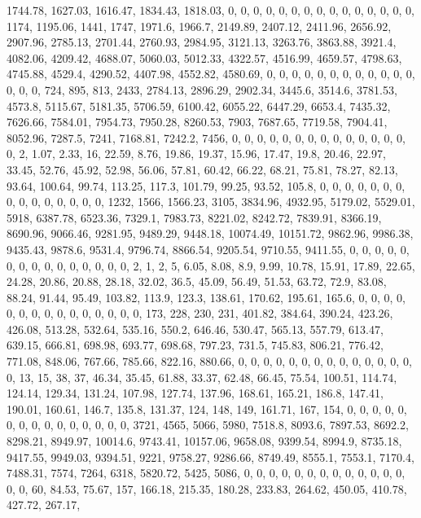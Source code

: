 \documentclass[
]{article}
\begin{document}
1744.78, 1627.03, 1616.47, 1834.43, 1818.03, 0, 0, 0, 0, 0, 0, 0, 0, 0,
0, 0, 0, 0, 0, 0, 1174, 1195.06, 1441, 1747, 1971.6, 1966.7, 2149.89,
2407.12, 2411.96, 2656.92, 2907.96, 2785.13, 2701.44, 2760.93, 2984.95,
3121.13, 3263.76, 3863.88, 3921.4, 4082.06, 4209.42, 4688.07, 5060.03,
5012.33, 4322.57, 4516.99, 4659.57, 4798.63, 4745.88, 4529.4, 4290.52,
4407.98, 4552.82, 4580.69, 0, 0, 0, 0, 0, 0, 0, 0, 0, 0, 0, 0, 0, 0, 0,
724, 895, 813, 2433, 2784.13, 2896.29, 2902.34, 3445.6, 3514.6, 3781.53,
4573.8, 5115.67, 5181.35, 5706.59, 6100.42, 6055.22, 6447.29, 6653.4,
7435.32, 7626.66, 7584.01, 7954.73, 7950.28, 8260.53, 7903, 7687.65,
7719.58, 7904.41, 8052.96, 7287.5, 7241, 7168.81, 7242.2, 7456, 0, 0, 0,
0, 0, 0, 0, 0, 0, 0, 0, 0, 0, 0, 0, 2, 1.07, 2.33, 16, 22.59, 8.76,
19.86, 19.37, 15.96, 17.47, 19.8, 20.46, 22.97, 33.45, 52.76, 45.92,
52.98, 56.06, 57.81, 60.42, 66.22, 68.21, 75.81, 78.27, 82.13, 93.64,
100.64, 99.74, 113.25, 117.3, 101.79, 99.25, 93.52, 105.8, 0, 0, 0, 0,
0, 0, 0, 0, 0, 0, 0, 0, 0, 0, 0, 1232, 1566, 1566.23, 3105, 3834.96,
4932.95, 5179.02, 5529.01, 5918, 6387.78, 6523.36, 7329.1, 7983.73,
8221.02, 8242.72, 7839.91, 8366.19, 8690.96, 9066.46, 9281.95, 9489.29,
9448.18, 10074.49, 10151.72, 9862.96, 9986.38, 9435.43, 9878.6, 9531.4,
9796.74, 8866.54, 9205.54, 9710.55, 9411.55, 0, 0, 0, 0, 0, 0, 0, 0, 0,
0, 0, 0, 0, 0, 0, 2, 1, 2, 5, 6.05, 8.08, 8.9, 9.99, 10.78, 15.91,
17.89, 22.65, 24.28, 20.86, 20.88, 28.18, 32.02, 36.5, 45.09, 56.49,
51.53, 63.72, 72.9, 83.08, 88.24, 91.44, 95.49, 103.82, 113.9, 123.3,
138.61, 170.62, 195.61, 165.6, 0, 0, 0, 0, 0, 0, 0, 0, 0, 0, 0, 0, 0, 0,
0, 173, 228, 230, 231, 401.82, 384.64, 390.24, 423.26, 426.08, 513.28,
532.64, 535.16, 550.2, 646.46, 530.47, 565.13, 557.79, 613.47, 639.15,
666.81, 698.98, 693.77, 698.68, 797.23, 731.5, 745.83, 806.21, 776.42,
771.08, 848.06, 767.66, 785.66, 822.16, 880.66, 0, 0, 0, 0, 0, 0, 0, 0,
0, 0, 0, 0, 0, 0, 0, 13, 15, 38, 37, 46.34, 35.45, 61.88, 33.37, 62.48,
66.45, 75.54, 100.51, 114.74, 124.14, 129.34, 131.24, 107.98, 127.74,
137.96, 168.61, 165.21, 186.8, 147.41, 190.01, 160.61, 146.7, 135.8,
131.37, 124, 148, 149, 161.71, 167, 154, 0, 0, 0, 0, 0, 0, 0, 0, 0, 0,
0, 0, 0, 0, 0, 3721, 4565, 5066, 5980, 7518.8, 8093.6, 7897.53, 8692.2,
8298.21, 8949.97, 10014.6, 9743.41, 10157.06, 9658.08, 9399.54, 8994.9,
8735.18, 9417.55, 9949.03, 9394.51, 9221, 9758.27, 9286.66, 8749.49,
8555.1, 7553.1, 7170.4, 7488.31, 7574, 7264, 6318, 5820.72, 5425, 5086,
0, 0, 0, 0, 0, 0, 0, 0, 0, 0, 0, 0, 0, 0, 0, 60, 84.53, 75.67, 157,
166.18, 215.35, 180.28, 233.83, 264.62, 450.05, 410.78, 427.72, 267.17,
\end{document}
